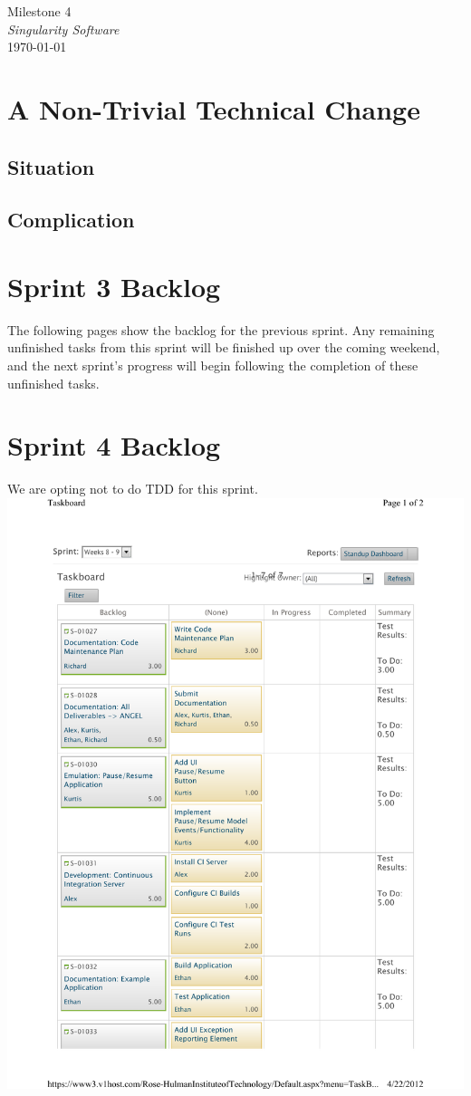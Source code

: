 \documentclass[12pt]{article}
\begin{document}
\begin{center}
	\LARGE{Milestone 4} \\
	\Large{\textit{Singularity Software}} \\
	\vspace{.05in}
	\normalsize{\today} \\
\end{center}

\section*{A Non-Trivial Technical Change}
\subsection*{Situation}


\subsection*{Complication}


\section*{Sprint 3 Backlog}
The following pages show the backlog for the previous sprint. Any remaining unfinished tasks from this sprint will be finished up over the coming weekend, and the next sprint's progress will begin following the completion of these unfinished tasks.



\section*{Sprint 4 Backlog}
We are opting not to do TDD for this sprint.
\includegraphics[scale=.85]{pdfs/MS4VersionOne/NewSprintDetail.pdf}

\clearpage

        
\end{document}
